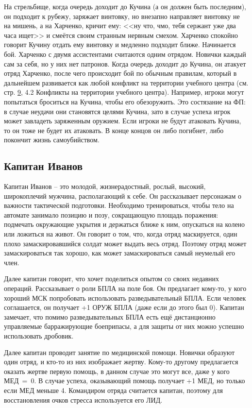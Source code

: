 \documentclass{article}
\begin{document}
На стрельбище, когда очередь доходит до Кучина (а он должен быть
последним), он подходит к рубежу, заряжает винтовку, но внезапно
направляет винтовку не на мишень, а на Харченко, кричит ему: <<ну что,
чмо, тебя сержант уже два часа ищет>> и смеётся своим странным нервным
смехом. Харченко спокойно говорит Кучину отдать ему винтовку и медленно
подходит ближе. Начинается бой. Харченко с двумя ассистентами считаются
одним отрядом. Новички каждый сам за себя, но у них нет патронов. Когда
очередь доходит до Кучина, он атакует отряд Харченко, после чего
происходит бой по обычным правилам, который в дальнейшем развивается как
любой конфликт на территории учебного центра (см. стр.
\hyperref[training-conflicts]{9},
4.2 Конфликты на территории учебного центра). Например, игроки могут
попытаться броситься на Кучина, чтобы его обезоружить. Это состязание на
ФП: в случае неудачи они становятся целями Кучина, зато в случае успеха
игрок может завладеть заряженным оружием. Если игроки не будут атаковать
Кучина, то он тоже не будет их атаковать. В конце концов он либо
погибнет, либо покончит жизнь самоубийством.

\subsection{Капитан
Иванов}\label{captain-ivanov}

Капитан Иванов -- это молодой, жизнерадостный, рослый, высокий,
широкоплечий мужчина, располагающий к себе. Он рассказывает персонажам о
важности тактической подготовки. Необходимо тренироваться, чтобы тело на
автомате занимало позицию и позу, сокращающую площадь поражения:
подмечать окружающие укрытия и держаться ближе к ним, опускаться на
колено или ложиться на живот. Он говорит о том, что, когда отряд
маскируется, один плохо замаскировавшийся солдат может выдать весь
отряд. Поэтому отряд может замаскироваться так хорошо, как может
замаскироваться самый неумелый его член.

Далее капитан говорит, что хочет поделиться опытом со своих недавних
операций. Рассказывает о роли БПЛА на поле боя. Он предлагает кому-то, у
кого хороший МСК попробовать использовать разведывательный БПЛА. Если
человек соглашается, он получает +1 ОРУЖ БПЛА (даже если до этого был
0). Капитан замечает, что помимо разведывательных БПЛА есть ещё
дистанционно управляемые барражирующие боеприпасы, а для защиты от них
можно успешно использовать дробовик.

Далее капитан проводит занятие по медицинской помощи. Новички образуют
один отряд, и кто-то из них изображает жертву. Кому-то другому
предлагается оказать жертве первую помощь, в данном случае это могут
все, даже у кого МЕД~=~0. В случае успеха, оказывающий помощь получает
+1 МЕД, но только если МЕД меньше 4. Командиром отряда считается
капитан, поэтому для восстановления очков стресса используется его ЛИД.
\end{document}

